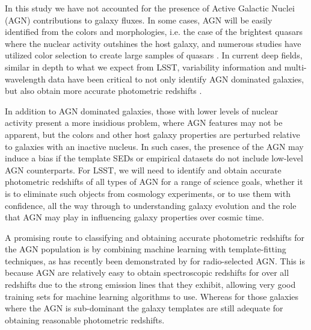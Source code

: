 \documentclass[usenatbib]{mn2e}
\newcommand{\red}[1]{\textcolor{red}{#1}}
\begin{document}

In this study we have not accounted for the presence of Active Galactic Nuclei (AGN) contributions to galaxy fluxes. In some cases, AGN will be easily identified from the colors and morphologies, i.e. the case of the brightest quasars where the nuclear activity outshines the host galaxy, and numerous studies have utilized color selection to create large samples of quasars \citep[e.g.][]{Richards:06,Maddox:08,Richards:15}.  In current deep fields, similar in depth to what we expect from LSST, variability information and multi-wavelength data have been critical to not only identify AGN dominated galaxies, but also obtain more accurate photometric redshifts \citep[e.g][]{Salvato:11}.  

In addition to AGN dominated galaxies, those with lower levels of nuclear activity present a more insidious problem, where AGN features may not be apparent, but the colors and other host galaxy properties are perturbed relative to galaxies with an inactive nucleus.  In such cases, the presence of the AGN may induce a bias if the template SEDs or empirical datasets do not include low-level AGN counterparts. 
For LSST, we will need to identify and obtain accurate photometric redshifts of all types of AGN for a range of science goals, whether it is to eliminate such objects from cosmology experiments, or to use them with confidence, all the way through to understanding galaxy evolution and the role that AGN may play in influencing galaxy properties over cosmic time.

A promising route to classifying and obtaining accurate photometric redshifts for the AGN population is by combining machine learning with template-fitting techniques, as has recently been demonstrated by \citet{Duncan:18} for radio-selected AGN. This is because AGN are relatively easy to obtain spectroscopic redshifts for over all redshifts due to the strong emission lines that they exhibit, allowing very good training sets for machine learning algorithms to use. Whereas for those galaxies where the AGN is sub-dominant the galaxy templates are still adequate for obtaining reasonable photometric redshifts.
\end{document}

